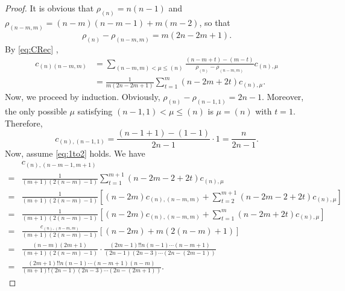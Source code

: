 \documentclass[10pt,oneside,american]{amsart}
\numberwithin{equation}{section}
\numberwithin{figure}{section}
\theoremstyle{definition}
\theoremstyle{remark}
\theoremstyle{plain}
\theoremstyle{definition}
\theoremstyle{plain}
\theoremstyle{plain}
\theoremstyle{plain}
\begin{document}
\begin{proof}
It is obvious that $\rho_{\left(n\right)}=n\left(n-1\right)$ and $\rho_{\left(n-m,m\right)}=\left(n-m\right)\left(n-m-1\right)+m\left(m-2\right)$,
so that 
\begin{equation}
\rho_{\left(n\right)}-\rho_{\left(n-m,m\right)}=m\left(2n-2m+1\right). \label{eq:coeff1to2}
\end{equation}
By \eqref{eq:CRec} ,
\begin{align*}
c_{\left(n\right)\left(n-m,m\right)}&=\sum_{\left(n-m,m\right)<\mu\leq\left(n\right)}\frac{\left(n-m+t\right)-\left(m-t\right)}{\rho_{\left(n\right)}-\rho_{\left(n-m,m\right)}}c_{\left(n\right),\mu}\\&=\frac{1}{m\left(2n-2m+1\right)}\sum_{t=1}^{m}\left(n-2m+2t\right)c_{\left(n\right),\mu}.
\end{align*}
Now, we proceed by induction. Obviously, $ \rho_{\left(n\right)}-\rho_{\left(n-1,1\right)}=2n-1$. 
Moreover, the only possible $\mu$ satisfying $\left(n-1,1\right)<\mu\leq\left(n\right)$
is $\mu=\left(n\right)$ with $t=1$. Therefore, 
\[
  c_{\left(n\right),\left(n-1,1\right)}=\frac{\left(n-1+1\right)-\left(1-1\right)}{2n-1}\cdot1=\frac{n}{2n-1}.
\]
Now, assume \eqref{eq:1to2} holds. We have
\begin{align*}
 & c_{\left(n\right),\left(n-m-1,m+1\right)}\\
 =& \frac{1}{\left(m+1\right)\left(2\left(n-m\right)-1\right)}\sum_{t=1}^{m+1}\left(n-2m-2+2t\right)c_{\left(n\right),\mu}\\
 =& \frac{1}{\left(m+1\right)\left(2\left(n-m\right)-1\right)}\left[\left(n-2m\right)c_{\left(n\right),\left(n-m,m\right)}+\sum_{t=2}^{m+1}\left(n-2m-2+2t\right)c_{\left(n\right),\mu}\right]\\
= & \frac{1}{\left(m+1\right)\left(2\left(n-m\right)-1\right)}\left[\left(n-2m\right)c_{\left(n\right),\left(n-m,m\right)}+\sum_{t=1}^{m}\left(n-2m+2t\right)c_{\left(n\right),\mu}\right]\\
 =& \frac{c_{\left(n\right),\left(n-m,m\right)}}{\left(m+1\right)\left(2\left(n-m\right)-1\right)}\left[\left(n-2m\right)+m\left(2\left(n-m\right)+1\right)\right]\\
 =& \frac{\left(n-m\right)\left(2m+1\right)}{\left(m+1\right)\left(2\left(n-m\right)-1\right)}\cdot\frac{\left(2m-1\right)!!n\left(n-1\right)\cdots\left(n-m+1\right)}{\left(2n-1\right)\left(2n-3\right)\cdots\left(2n-\left(2m-1\right)\right)}\\
= & \frac{\left(2m+1\right)!!n\left(n-1\right)\cdots\left(n-m+1\right)\left(n-m\right)}{\left(m+1\right)!\left(2n-1\right)\left(2n-3\right)\cdots\left(2n-\left(2m+1\right)\right)}.
\end{align*}
\end{proof}
\end{document}
